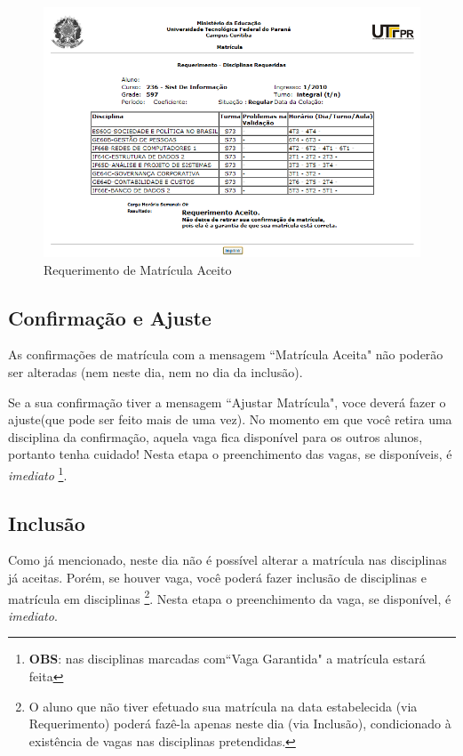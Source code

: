 \documentclass[a4paper,12pt,openany]{article}
\begin{document}
	\begin{figure}[ht!]  \centering
		\includegraphics[scale=0.75]{Matricula_Requerimento_Aceito.png}
		\caption{Requerimento de Matrícula Aceito}
		\label{matriculaRequerimentoAceito}
	\end{figure}

\newpage

\subsection{Confirmação e Ajuste}
As confirmações de matrícula com a mensagem ``Matrícula Aceita" não poderão ser alteradas (nem neste dia, nem no dia da inclusão).

Se a sua confirmação tiver a mensagem ``Ajustar Matrícula", voce deverá fazer o ajuste(que pode ser feito mais de uma vez). No momento em que você retira uma disciplina da confirmação, aquela vaga fica disponível para os outros alunos, portanto tenha cuidado! Nesta etapa o preenchimento das vagas, se disponíveis, é \textit{imediato} \footnote{ \textbf{OBS}: nas disciplinas  marcadas com``Vaga Garantida"  a matrícula estará feita}. 

\subsection{Inclusão}

Como já mencionado, neste dia não é possível alterar a matrícula nas disciplinas já aceitas. Porém, se houver vaga, você poderá fazer inclusão de disciplinas e matrícula em disciplinas \footnote{O aluno que não tiver efetuado sua matrícula na data estabelecida (via Requerimento) poderá fazê-la apenas neste dia (via Inclusão), condicionado à existência de vagas nas disciplinas pretendidas.}.
Nesta etapa o preenchimento da vaga, se disponível, é \textit{imediato}. 
\end{document}
